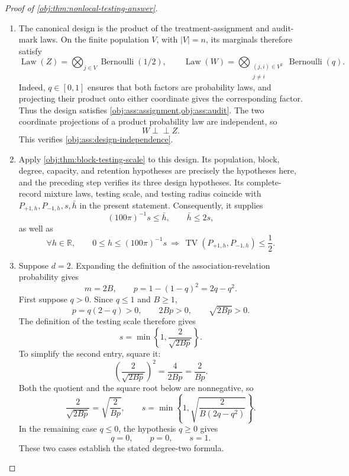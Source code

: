 \documentclass[11pt]{article}
\begin{document}
\begin{proof}[Proof of \cref{obj:thm:nonlocal-testing-answer}]
\begin{enumerate}
\item The canonical design is the product of the treatment-assignment and audit-mark laws. On the finite population \(V\), with \(|V|=n\), its marginals therefore satisfy
\[
\operatorname{Law}(Z)
=\bigotimes_{j\in V}\operatorname{Bernoulli}(1/2),
\qquad
\operatorname{Law}(W)
=\bigotimes_{\substack{(j,i)\in V^2\\j\ne i}}
\operatorname{Bernoulli}(q).
\]
Indeed, \(q\in[0,1]\) ensures that both factors are probability laws, and projecting their product onto either coordinate gives the corresponding factor. Thus the design satisfies \cref{obj:ass:assignment,obj:ass:audit}.
The two coordinate projections of a product probability law are independent, so
\[
W\mathbin{\perp\!\!\!\perp}Z.
\]
This verifies \cref{obj:ass:design-independence}.

\item Apply \cref{obj:thm:block-testing-scale} to this design. Its population, block, degree, capacity, and retention hypotheses are precisely the hypotheses here, and the preceding step verifies its three design hypotheses. Its complete-record mixture laws, testing scale, and testing radius coincide with \(P_{+1,h},P_{-1,h},s,\bar h\) in the present statement. Consequently, it supplies
\[
(100\pi)^{-1}s\le\bar h,
\qquad
\bar h\le2s,
\]
as well as
\[
\forall h\in\mathbb R,\qquad
0\le h\le(100\pi)^{-1}s
\ \Longrightarrow\
\operatorname{TV}(P_{+1,h},P_{-1,h})\le\frac12.
\]

\item Suppose \(d=2\). Expanding the definition of the association-revelation probability gives
\[
m=2B,
\qquad
p=1-(1-q)^2=2q-q^2.
\]
First suppose \(q>0\). Since \(q\le1\) and \(B\ge1\),
\[
p=q(2-q)>0,
\qquad
2Bp>0,
\qquad
\sqrt{2Bp}>0.
\]
The definition of the testing scale therefore gives
\[
s=\min\left\{1,\frac{2}{\sqrt{2Bp}}\right\}.
\]
To simplify the second entry, square it:
\[
\left(\frac{2}{\sqrt{2Bp}}\right)^2
=\frac{4}{2Bp}
=\frac{2}{Bp}.
\]
Both the quotient and the square root below are nonnegative, so
\[
\frac{2}{\sqrt{2Bp}}
=\sqrt{\frac{2}{Bp}},
\qquad
s=\min\left\{1,\sqrt{\frac{2}{B(2q-q^2)}}\right\}.
\]
In the remaining case \(q\le0\), the hypothesis \(q\ge0\) gives
\[
q=0,\qquad p=0,\qquad s=1.
\]
These two cases establish the stated degree-two formula.
\end{enumerate}
\end{proof}
\end{document}
